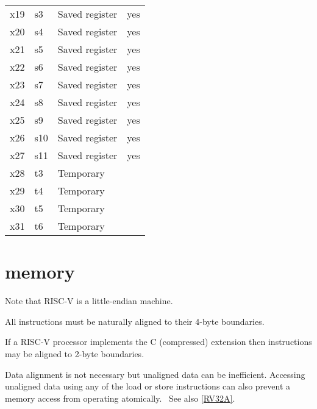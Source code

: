 \begin{center}
\begin{tabular}{|l|l|l|l|}
x19	&	s3		& Saved register					& yes		\\
x20	&	s4		& Saved register					& yes		\\
x21	&	s5		& Saved register					& yes		\\
x22	&	s6		& Saved register					& yes		\\
x23	&	s7		& Saved register					& yes		\\
x24	&	s8		& Saved register					& yes		\\
x25	&	s9		& Saved register					& yes		\\
x26	&	s10		& Saved register					& yes		\\
x27	&	s11		& Saved register					& yes		\\
x28	&	t3		& Temporary							&			\\
x29	&	t4		& Temporary							&			\\
x30	&	t5		& Temporary							&			\\
x31	&	t6		& Temporary							&			\\
\hline
\end{tabular}
\end{center}



\section{memory}

Note that RISC-V is a little-endian machine.  

All instructions must be naturally aligned to their 4-byte 
boundaries.~\cite[p.~5]{rvismv1v22:2017}

If a RISC-V processor implements the C (compressed) extension then 
instructions may be aligned to 2-byte 
boundaries.\cite[p.~68]{rvismv1v22:2017}

Data alignment is not necessary but unaligned data can be inefficient.  
Accessing unaligned data using any of the load or store instructions can 
also prevent a memory access from operating 
atomically.~\cite[p.19]{rvismv1v22:2017}  See also \autoref{RV32A}.



